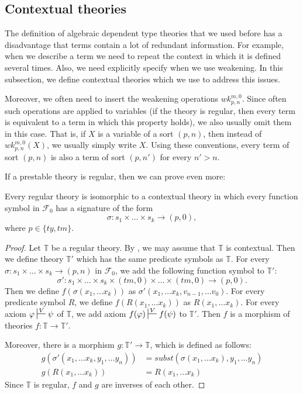 \documentclass[reqno]{amsart}
\theoremstyle{definition}
\theoremstyle{remark}
\numberwithin{figure}{section}
\begin{document}
\subsection{Contextual theories}

The definition of algebraic dependent type theories that we used before has a disadvantage that terms contain a lot of redundant information.
For example, when we describe a term we need to repeat the context in which it is defined several times.
Also, we need explicitly specify when we use weakening.
In this subsection, we define contextual theories which we use to address this issues.

Moreover, we often need to insert the weakening operations $wk^{m,0}_{p,n}$.
Since often such operations are applied to variables (if the theory is regular, then every term is equivalent to a term in which this property holds),
we also usually omit them in this case.
That is, if $X$ is a variable of a sort $(p,n)$, then instead of $wk^{m,0}_{p,n}(X)$, we usually simply write $X$.
Using these conventions, every term of sort $(p,n)$ is also a term of sort $(p,n')$ for every $n' > n$.

If a prestable theory is regular, then we can prove even more:
\begin{lem}
Every regular theory is isomorphic to a contextual theory in which every function symbol in $\mathcal{F}_0$ has a signature of the form
\[ \sigma : s_1 \times \ldots \times s_k \to (p,0), \]
where $p \in \{ ty,tm \}$.
\end{lem}
\begin{proof}
Let $\mathbb{T}$ be a regular theory.
By , we may assume that $\mathbb{T}$ is contextual.
Then we define theory $\mathbb{T}'$ which has the same predicate symbols as $\mathbb{T}$.
For every $\sigma : s_1 \times \ldots \times s_k \to (p,n)$ in $\mathcal{F}_0$, we add the following function symbol to $\mathbb{T}'$:
\[ \sigma' : s_1 \times \ldots \times s_k \times (tm,0) \times \ldots \times (tm,0) \to (p,0). \]
Then we define $f(\sigma(x_1, \ldots x_k))$ as $\sigma'(x_1, \ldots x_k, v_{n-1}, \ldots v_0)$.
For every predicate symbol $R$, we define $f(R(x_1, \ldots x_k))$ as $R(x_1, \ldots x_k)$.
For every axiom $\varphi \sststile{}{V} \psi$ of $\mathbb{T}$, we add axiom $f(\varphi) \sststile{}{V} f(\psi)$ to $\mathbb{T}'$.
Then $f$ is a morphism of theories $f : \mathbb{T} \to \mathbb{T}'$.

Moreover, there is a morphism $g : \mathbb{T}' \to \mathbb{T}$, which is defined as follows:
\begin{align*}
g(\sigma'(x_1, \ldots x_k, y_1, \ldots y_n)) & = subst(\sigma(x_1, \ldots x_k), y_1, \ldots y_n) \\
g(R(x_1, \ldots x_k)) & = R(x_1, \ldots x_k)
\end{align*}
Since $\mathbb{T}$ is regular, $f$ and $g$ are inverses of each other.
\end{proof}
\end{document}
